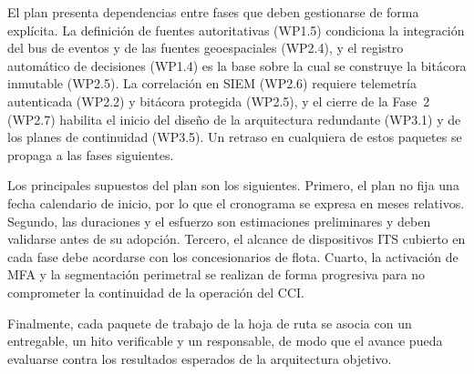 El plan presenta dependencias entre fases que deben gestionarse de forma explícita. La definición de fuentes autoritativas (WP1.5)
condiciona la integración del bus de eventos y de las fuentes geoespaciales (WP2.4), y el registro automático de decisiones (WP1.4)
es la base sobre la cual se construye la bitácora inmutable (WP2.5). La correlación en SIEM (WP2.6) requiere telemetría autenticada
(WP2.2) y bitácora protegida (WP2.5), y el cierre de la Fase~2 (WP2.7) habilita el inicio del diseño de la arquitectura redundante
(WP3.1) y de los planes de continuidad (WP3.5). Un retraso en cualquiera de estos paquetes se propaga a las fases siguientes.

Los principales supuestos del plan son los siguientes. Primero, el plan no fija una fecha calendario de inicio, por lo que
el cronograma se expresa en meses relativos. Segundo, las duraciones y el esfuerzo son estimaciones preliminares y deben validarse
antes de su adopción. Tercero, el alcance de dispositivos ITS cubierto en cada fase debe acordarse con los concesionarios de flota. Cuarto, la
activación de MFA y la segmentación perimetral se realizan de forma progresiva para no comprometer la continuidad de la operación
del CCI.

Finalmente, cada paquete de trabajo de la hoja de ruta se asocia con un entregable, un hito
verificable y un responsable, de modo que el avance pueda evaluarse contra los resultados esperados de la arquitectura objetivo.